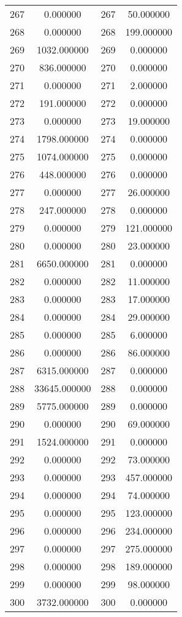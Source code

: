 \documentclass[12pt]{article}
\begin{document}
\begin{longtable}{@{}cccc@{}}
267 & 0.000000 & 267 & 50.000000 \\
268 & 0.000000 & 268 & 199.000000 \\
269 & 1032.000000 & 269 & 0.000000 \\
270 & 836.000000 & 270 & 0.000000 \\
271 & 0.000000 & 271 & 2.000000 \\
272 & 191.000000 & 272 & 0.000000 \\
273 & 0.000000 & 273 & 19.000000 \\
274 & 1798.000000 & 274 & 0.000000 \\
275 & 1074.000000 & 275 & 0.000000 \\
276 & 448.000000 & 276 & 0.000000 \\
277 & 0.000000 & 277 & 26.000000 \\
278 & 247.000000 & 278 & 0.000000 \\
279 & 0.000000 & 279 & 121.000000 \\
280 & 0.000000 & 280 & 23.000000 \\
281 & 6650.000000 & 281 & 0.000000 \\
282 & 0.000000 & 282 & 11.000000 \\
283 & 0.000000 & 283 & 17.000000 \\
284 & 0.000000 & 284 & 29.000000 \\
285 & 0.000000 & 285 & 6.000000 \\
286 & 0.000000 & 286 & 86.000000 \\
287 & 6315.000000 & 287 & 0.000000 \\
288 & 33645.000000 & 288 & 0.000000 \\
289 & 5775.000000 & 289 & 0.000000 \\
290 & 0.000000 & 290 & 69.000000 \\
291 & 1524.000000 & 291 & 0.000000 \\
292 & 0.000000 & 292 & 73.000000 \\
293 & 0.000000 & 293 & 457.000000 \\
294 & 0.000000 & 294 & 74.000000 \\
295 & 0.000000 & 295 & 123.000000 \\
296 & 0.000000 & 296 & 234.000000 \\
297 & 0.000000 & 297 & 275.000000 \\
298 & 0.000000 & 298 & 189.000000 \\
299 & 0.000000 & 299 & 98.000000 \\
300 & 3732.000000 & 300 & 0.000000 \\

\end{longtable}
\end{document}

